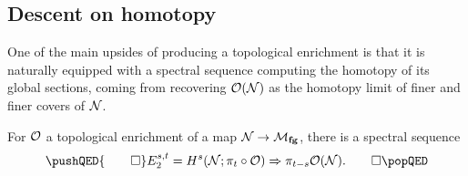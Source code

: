 \subsection*{Descent on homotopy}

One of the main upsides of producing a topological enrichment is that it is naturally equipped with a spectral sequence computing the homotopy of its global sections, coming from recovering $\mathcal{O}(\mathcal{N})$ as the homotopy limit of finer and finer covers of $\mathcal{N}$.

\begin{lemma}
For $\mathcal{O}$ a topological enrichment of a map $\mathcal{N} \to \mathcal{M}_{\mathbf{fg}}$, there is a spectral sequence \[\pushQED{\qed} E_2^{s, t} = H^s(\stack{N}; \pi_t \circ \sheaf O) \Rightarrow \pi_{t-s} \sheaf{O}(\stack{N}). \qedhere \popQED\]
\end{lemma}

